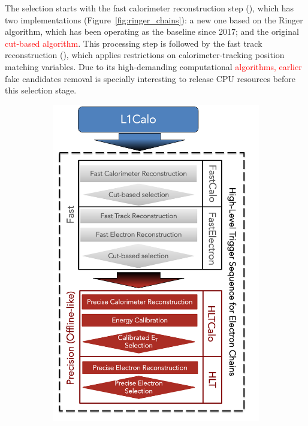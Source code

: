 The \hlt{} selection starts with the fast calorimeter reconstruction
step (\fastcalo), which has two implementations
(Figure~\ref{fig:ringer_chains}): a new one based on the Ringer algorithm, which
has been operating as the baseline since 2017; and the original \textcolor{red}{cut-based
algorithm}.%
This processing step is followed by the fast track reconstruction
(\fastelectron), which applies restrictions on calorimeter-tracking position
matching variables. Due to its high-demanding computational \textcolor{red}{algorithms, earlier}
 fake candidates removal is specially
interesting to release CPU resources before this selection stage.


\begin{figure}[h!tb]
  \begin{center}
  \begin{subfigure}[c]{.48\textwidth}
  \centering
  \includegraphics[width=\textwidth]{sections/context/figures/ElectronChain_Run2_cutbased.pdf}

\end{subfigure}
\end{center}
\end{figure}
